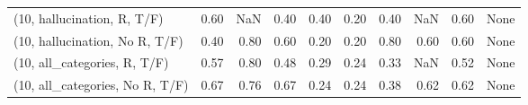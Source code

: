 \begin{table*}[h!]
\begin{adjustbox}{width=2\columnwidth,center}
\begin{tabular}{lrrr|rrr|rrr}
(10, hallucination, R, T/F)           &                      0.60 &                   NaN &                      0.40 &                          0.40 &                      0.20 &                          0.40 &                                    NaN &                               0.60 &                                  None \\
(10, hallucination, No R, T/F)        &                      0.40 &                  0.80 &                      0.60 &                          0.20 &                      0.20 &                          0.80 &                                   0.60 &                               0.60 &                                  None \\
(10, all\_categories, R, T/F)          &                      0.57 &                  0.80 &                      0.48 &                          0.29 &                      0.24 &                          0.33 &                                    NaN &                               0.52 &                                  None \\
(10, all\_categories, No R, T/F)       &                      0.67 &                  0.76 &                      0.67 &                          0.24 &                      0.24 &                          0.38 &                                   0.62 &                               0.62 &                                  None \\




\end{tabular}
\end{adjustbox}
\end{table*}
